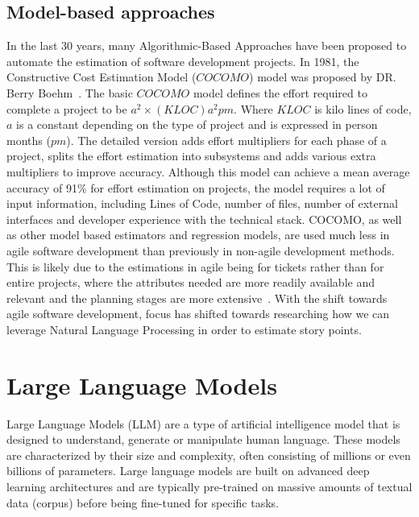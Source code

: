 \documentclass{UoYCSproject}
\begin{document}
    \subsection{Model-based approaches}\label{subsec:model-based-approaches}
    In the last 30 years, many Algorithmic-Based Approaches have been proposed to automate the estimation of software development projects.
    In 1981, the Constructive Cost Estimation Model ($COCOMO$) model was proposed by DR. Berry Boehm~\cite{Boehm2001}.
    The basic $COCOMO$ model defines the effort required to complete a project to be $a^2 \times (KLOC)a^2pm$.
    Where $KLOC$ is kilo lines of code, $a$ is a constant depending on the type of project and is expressed in person months ($pm$). The detailed version adds effort multipliers for each phase of a project, splits the effort estimation into subsystems and adds various extra multipliers to improve accuracy.
    Although this model can achieve a mean average accuracy of 91\% for effort estimation on projects, the model requires a lot of input information, including Lines of Code, number of files, number of external interfaces and developer experience with the technical stack.
    COCOMO, as well as other model based estimators and regression models, are used much less in agile software development than previously in non-agile development methods.
    This is likely due to the estimations in agile being for tickets rather than for entire projects, where the attributes needed are more readily available and relevant and the planning stages are more extensive~\cite{effortestimationsurvey}.
    With the shift towards agile software development, focus has shifted towards researching how we can leverage Natural Language Processing in order to estimate story points.




    \section{Large Language Models}
    \label{sec:large-language-models}
    Large Language Models (LLM) are a type of artificial intelligence model that is designed to understand, generate
    or manipulate human language.
    These models are characterized by their size and complexity, often consisting of millions or even billions of parameters.
    Large language models are built on advanced deep learning architectures and are typically pre-trained on massive amounts of textual data (corpus) before being fine-tuned for specific tasks. \par
\end{document}
